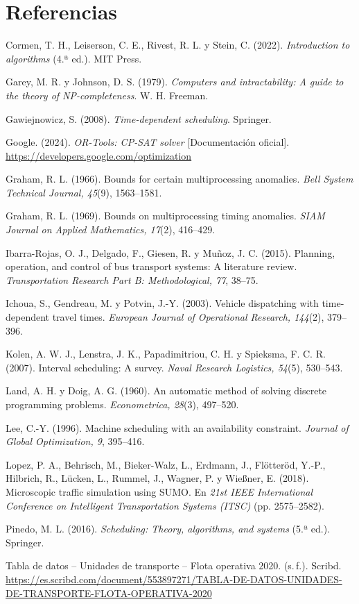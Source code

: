 \section*{Referencias}
\begingroup
\setlength{\parindent}{-1cm}\setlength{\leftskip}{1cm}\setlength{\parskip}{5pt}\raggedright

Cormen, T. H., Leiserson, C. E., Rivest, R. L. y Stein, C. (2022). \emph{Introduction to algorithms} (4.ª ed.). MIT Press.

Garey, M. R. y Johnson, D. S. (1979). \emph{Computers and intractability: A guide to the theory of NP-completeness}. W. H. Freeman.

Gawiejnowicz, S. (2008). \emph{Time-dependent scheduling}. Springer.

Google. (2024). \emph{OR-Tools: CP-SAT solver} [Documentación oficial]. \url{https://developers.google.com/optimization}

Graham, R. L. (1966). Bounds for certain multiprocessing anomalies. \emph{Bell System Technical Journal, 45}(9), 1563--1581.

Graham, R. L. (1969). Bounds on multiprocessing timing anomalies. \emph{SIAM Journal on Applied Mathematics, 17}(2), 416--429.

Ibarra-Rojas, O. J., Delgado, F., Giesen, R. y Muñoz, J. C. (2015). Planning, operation, and control of bus transport systems: A literature review. \emph{Transportation Research Part B: Methodological, 77}, 38--75.

Ichoua, S., Gendreau, M. y Potvin, J.-Y. (2003). Vehicle dispatching with time-dependent travel times. \emph{European Journal of Operational Research, 144}(2), 379--396.

Kolen, A. W. J., Lenstra, J. K., Papadimitriou, C. H. y Spieksma, F. C. R. (2007). Interval scheduling: A survey. \emph{Naval Research Logistics, 54}(5), 530--543.

Land, A. H. y Doig, A. G. (1960). An automatic method of solving discrete programming problems. \emph{Econometrica, 28}(3), 497--520.

Lee, C.-Y. (1996). Machine scheduling with an availability constraint. \emph{Journal of Global Optimization, 9}, 395--416.

Lopez, P. A., Behrisch, M., Bieker-Walz, L., Erdmann, J., Flötteröd, Y.-P., Hilbrich, R., Lücken, L., Rummel, J., Wagner, P. y Wießner, E. (2018). Microscopic traffic simulation using SUMO. En \emph{21st IEEE International Conference on Intelligent Transportation Systems (ITSC)} (pp. 2575--2582).

Pinedo, M. L. (2016). \emph{Scheduling: Theory, algorithms, and systems} (5.ª ed.). Springer.

Tabla de datos -- Unidades de transporte -- Flota operativa 2020. (s.\,f.). Scribd. \url{https://es.scribd.com/document/553897271/TABLA-DE-DATOS-UNIDADES-DE-TRANSPORTE-FLOTA-OPERATIVA-2020}

\endgroup
